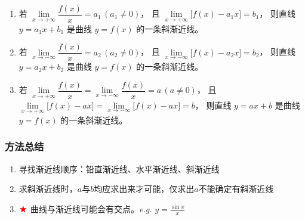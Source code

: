 \documentclass[../book.tex]{subfiles}
\begin{document}
    \begin{enumerate}
        \item 若 $\lim\limits_{x\to +\infty}\dfrac{f(x)}{x}=a_1\,(a_1\neq 0)$，
        且 $\lim\limits_{x\to +\infty}\bigl[f(x)-a_1x\bigr]=b_1$，
        则直线 $y=a_1x+b_1$ 是曲线 $y=f(x)$ 的一条斜渐近线。

        \item 若 $\lim\limits_{x\to -\infty}\dfrac{f(x)}{x}=a_2\,(a_2\neq 0)$，
        且 $\lim\limits_{x\to -\infty}\bigl[f(x)-a_2x\bigr]=b_2$，
        则直线 $y=a_2x+b_2$ 是曲线 $y=f(x)$ 的一条斜渐近线。

        \item 若 $\lim\limits_{x\to +\infty}\dfrac{f(x)}{x}
        =\lim\limits_{x\to -\infty}\dfrac{f(x)}{x}=a\,(a\neq 0)$，
        且 $\lim\limits_{x\to +\infty}\bigl[f(x)-ax\bigr]
        =\lim\limits_{x\to -\infty}\bigl[f(x)-ax\bigr]=b$，
        则直线 $y=ax+b$ 是曲线 $y=f(x)$ 的一条斜渐近线。
    \end{enumerate}

    \subsubsection{方法总结}

    \begin{enumerate}
        \item 寻找渐近线顺序：铅直渐近线、水平渐近线、斜渐近线
        \item 求斜渐近线时，$a$与$b$均应求出来才可能，仅求出$a$不能确定有斜渐近线
        \item $\color{red}{\bigstar}$ 曲线与渐近线可能会有交点。\emph{e.g.} $y = \displaystyle\frac{\sin x}{x}$
        \begin{center}
        \end{center}
    \end{enumerate}
\end{document}
